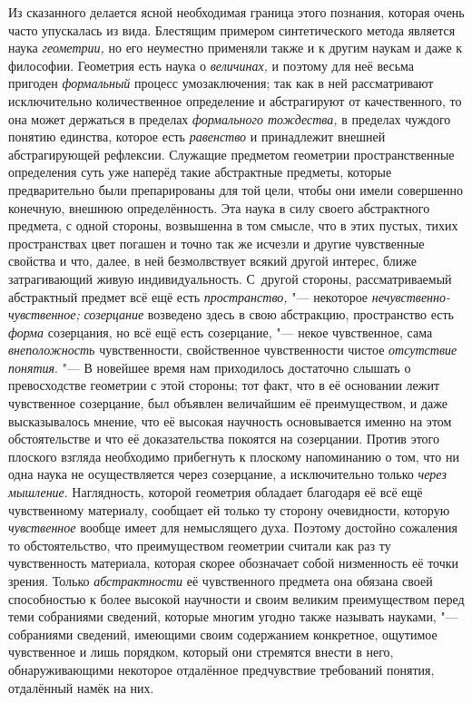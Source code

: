 Из сказанного делается ясной необходимая граница этого
познания, которая очень часто упускалась из вида. Блестящим примером
синтетического метода является наука
{\em геометрии,} но его
неуместно применяли также и к другим наукам и даже к философии. Геометрия
есть наука о {\em величинах,}
и поэтому для неё весьма пригоден
{\em формальный} процесс
умозаключения; так как в ней рассматривают исключительно
количественное определение и абстрагируют от качественного, то она может
держаться в пределах {\em формального
тождества,} в пределах чуждого понятию единства, которое
есть {\em равенство} и
принадлежит внешней абстрагирующей рефлексии. Служащие предметом геометрии
пространственные определения суть уже наперёд такие абстрактные предметы,
которые предварительно были препарированы для той цели, чтобы они имели
совершенно конечную, внешнюю определённость. Эта наука в силу своего
абстрактного предмета, с одной стороны, возвышенна в том смысле, что в этих
пустых, тихих пространствах цвет погашен и точно так же исчезли и другие
чувственные свойства и что, далее, в ней безмолвствует всякий другой
интерес, ближе затрагивающий живую индивидуальность. С~другой стороны,
рассматриваемый абстрактный предмет всё ещё есть
{\em пространство,} "---
некоторое
{\em нечувственно-чувственное;}
{\em созерцание} возведено
здесь в свою абстракцию, пространство есть
{\em форма} созерцания,
но всё ещё есть созерцание, "--- некое чувственное, сама
{\em внеположность}
чувственности, свойственное чувственности чистое
{\em отсутствие понятия}. "---
В новейшее время нам приходилось достаточно слышать о
превосходстве геометрии с этой стороны; тот факт, что в её основании лежит
чувственное созерцание, был объявлен величайшим её преимуществом, и даже
высказывалось мнение, что её высокая научность основывается именно на этом
обстоятельстве и что её доказательства покоятся на
созерцании.
Против этого плоского взгляда необходимо прибегнуть к
плоскому напоминанию о том, что ни одна наука не осуществляется через
созерцание, а исключительно только
{\em через мышление}.
Наглядность, которой геометрия обладает благодаря её всё ещё
чувственному материалу, сообщает ей только ту сторону очевидности, которую
{\em чувственное} вообще
имеет для немыслящего духа. Поэтому достойно сожаления то обстоятельство,
что преимуществом геометрии считали как раз ту чувственность материала,
которая скорее обозначает собой низменность её точки зрения. Только
{\em абстрактности} её
чувственного предмета она обязана своей способностью к более высокой
научности и своим великим преимуществом перед теми собраниями сведений,
которые многим угодно также называть науками, "--- собраниями
сведений, имеющими своим содержанием конкретное, ощутимое чувственное и
лишь порядком, который они стремятся внести в него, обнаруживающими
некоторое отдалённое предчувствие требований понятия, отдалённый намёк на
них.

